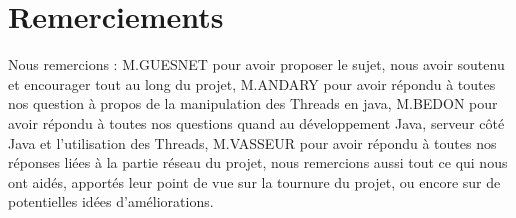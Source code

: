 \section*{Remerciements}

Nous remercions : \newline
	M.GUESNET pour avoir proposer le sujet, nous avoir soutenu et encourager tout au long du projet,\newline
	M.ANDARY pour avoir répondu à toutes nos question à propos de la manipulation des Threads en java,\newline
	M.BEDON pour avoir répondu à toutes nos questions quand au développement Java, serveur côté Java et l'utilisation des Threads,\newline
	M.VASSEUR pour avoir répondu à toutes nos réponses liées à la partie réseau du projet,\newline
	nous remercions aussi tout ce qui nous ont aidés, apportés leur point de vue sur la tournure du projet, ou encore sur de potentielles idées d'améliorations.